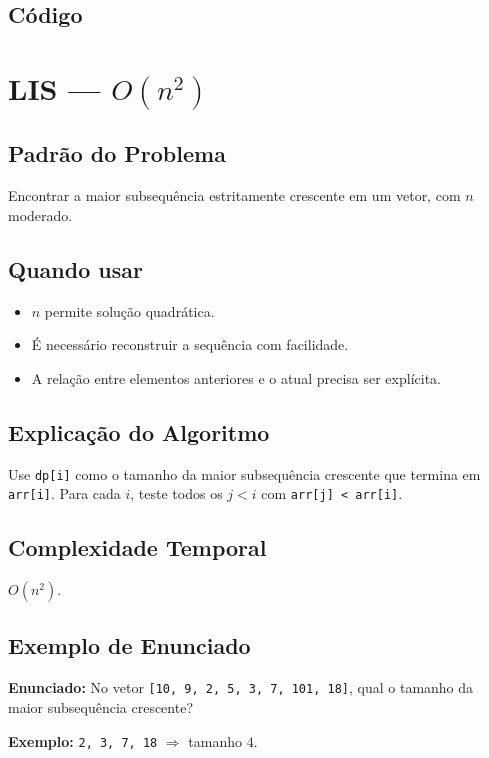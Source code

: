 \subsection{Código}

\section{LIS --- $O(n^2)$}

\subsection{Padrão do Problema}
Encontrar a maior subsequência estritamente crescente em um vetor, com $n$ moderado.

\subsection{Quando usar}
\begin{itemize}[nosep]
  \item $n$ permite solução quadrática.
  \item É necessário reconstruir a sequência com facilidade.
  \item A relação entre elementos anteriores e o atual precisa ser explícita.
\end{itemize}

\subsection{Explicação do Algoritmo}
Use \texttt{dp[i]} como o tamanho da maior subsequência crescente que termina em \texttt{arr[i]}. Para cada $i$, teste todos os $j < i$ com \texttt{arr[j] < arr[i]}.

\subsection{Complexidade Temporal}
$O(n^2)$.

\subsection{Exemplo de Enunciado}
\begin{exemplodiabox}
\textbf{Enunciado:} No vetor \texttt{[10, 9, 2, 5, 3, 7, 101, 18]}, qual o tamanho da maior subsequência crescente?

\textbf{Exemplo:} \texttt{2, 3, 7, 18} $\Rightarrow$ tamanho $4$.
\end{exemplodiabox}

